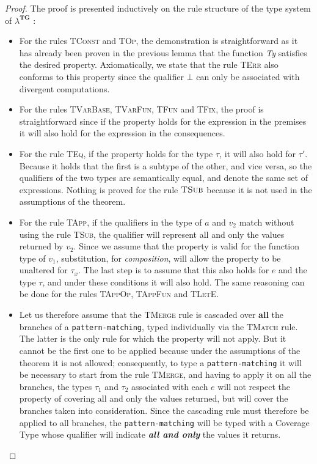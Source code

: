 \begin{proof}
    The proof is presented inductively on the rule structure of the type system of $\lambda^{\textbf{TG}}$ \cite{coverage}:
    \begin{itemize}
        \item For the rules \textsc{TConst} and \textsc{TOp}, the demonstration is straightforward as it has already been proven in the previous lemma that the function \emph{Ty} satisfies the desired property. Axiomatically, we state that the rule \textsc{TErr} also conforms to this property since the qualifier $\bot$ can only be associated with divergent computations.
        \item For the rules \textsc{TVarBase}, \textsc{TVarFun}, \textsc{TFun} and \textsc{TFix}, the proof is straightforward since if the property holds for the expression in the premises it will also hold for the expression in the consequences.
        \item For the rule \textsc{TEq}, if the property holds for the type $\tau$, it will also hold for $\tau'$. Because it holds that the first is a subtype of the other, and vice versa, so the qualifiers of the two types are semantically equal, and denote the same set of expressions. Nothing is proved for the rule $\textsc{TSub}$ because it is not used in the assumptions of the theorem.
        \item For the rule \textsc{TApp}, if the qualifiers in the type of $a$ and $v_2$ match without using the rule \textsc{TSub}, the qualifier will represent all and only the values returned by $v_2$. Since we assume that the property is valid for the function type of $v_1$, substitution, for \emph{composition}, will allow the property to be unaltered for $\tau_x$. The last step is to assume that this also holds for $e$ and the type $\tau$, and under these conditions it will also hold. The same reasoning can be done for the rules \textsc{TAppOp}, \textsc{TAppFun} and \textsc{TLetE}.
        \item Let us therefore assume that the \textsc{TMerge} rule is cascaded over \textbf{all} the branches of a \verb|pattern-matching|, typed individually via the \textsc{TMatch} rule. The latter is the only rule for which the property will not apply. But it cannot be the first one to be applied because under the assumptions of the theorem it is not allowed; consequently, to type a \verb|pattern-matching| it will be necessary to start from the rule \textsc{TMerge}, and having to apply it on all the branches, the types $\tau_1$ and $\tau_2$ associated with each $e$ will not respect the property of covering all and only the values returned, but will cover the branches taken into consideration. Since the cascading rule must therefore be applied to all branches, the \verb|pattern-matching| will be typed with a Coverage Type whose qualifier will indicate \textbf{\emph{all and only}} the values it returns.
    \end{itemize}


\end{proof}
